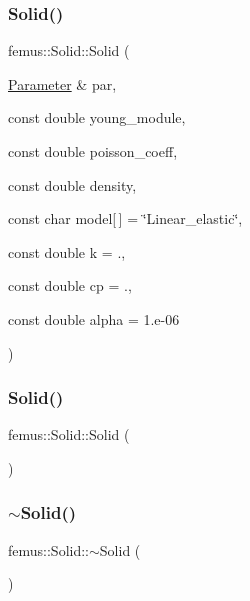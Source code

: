 \subsubsection{\texorpdfstring{Solid()}{Solid()}\hspace{0.1cm}{\footnotesize\ttfamily [2/3]}}
{\footnotesize\ttfamily femus\+::\+Solid\+::\+Solid (\begin{DoxyParamCaption}\item[{\mbox{\hyperlink{classfemus_1_1_parameter}{Parameter}} \&}]{par,  }\item[{const double}]{young\+\_\+module,  }\item[{const double}]{poisson\+\_\+coeff,  }\item[{const double}]{density,  }\item[{const char}]{model\mbox{[}$\,$\mbox{]} = {\ttfamily \char`\"{}Linear\+\_\+elastic\char`\"{}},  }\item[{const double}]{k = {.},  }\item[{const double}]{cp = {.},  }\item[{const double}]{alpha = {\ttfamily 1.e-\/06} }\end{DoxyParamCaption})}

\mbox{\label{classfemus_1_1_solid_a2d78d871f3e7af6d85508b08d32d82b0}} 
\subsubsection{\texorpdfstring{Solid()}{Solid()}\hspace{0.1cm}{\footnotesize\ttfamily [3/3]}}
{\footnotesize\ttfamily femus\+::\+Solid\+::\+Solid (\begin{DoxyParamCaption}{ }\end{DoxyParamCaption})}

\mbox{\label{classfemus_1_1_solid_a6df9755d69a4b107891c8eea67425270}} 
\subsubsection{\texorpdfstring{$\sim$\+Solid()}{~Solid()}}
{\footnotesize\ttfamily femus\+::\+Solid\+::$\sim$\+Solid (\begin{DoxyParamCaption}{ }\end{DoxyParamCaption})\hspace{0.3cm}{\ttfamily [inline]}}

